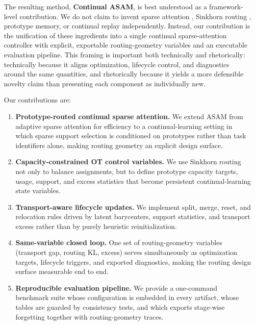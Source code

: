 \documentclass[11pt,a4paper]{article}
\theoremstyle{definition}
\begin{document}
The resulting method, \textbf{Continual ASAM}, is best understood as a framework-level contribution. We do not claim to invent sparse attention \citep{beltagy2020longformer,child2019generating,zaheer2020big}, Sinkhorn routing \citep{cuturi2013sinkhorn}, prototype memory, or continual replay independently. Instead, our contribution is the unification of these ingredients into a single continual sparse-attention controller with explicit, exportable routing-geometry variables and an executable evaluation pipeline. This framing is important both technically and rhetorically: technically because it aligns optimization, lifecycle control, and diagnostics around the same quantities, and rhetorically because it yields a more defensible novelty claim than presenting each component as individually new.

Our contributions are:
\begin{enumerate}
    \item \textbf{Prototype-routed continual sparse attention.} We extend ASAM from adaptive sparse attention for efficiency to a continual-learning setting in which sparse support selection is conditioned on prototypes rather than task identifiers alone, making routing geometry an explicit design surface.
    \item \textbf{Capacity-constrained OT control variables.} We use Sinkhorn routing not only to balance assignments, but to define prototype capacity targets, usage, support, and excess statistics that become persistent continual-learning state variables.
    \item \textbf{Transport-aware lifecycle updates.} We implement split, merge, reset, and relocation rules driven by latent barycenters, support statistics, and transport excess rather than by purely heuristic reinitialization.
    \item \textbf{Same-variable closed loop.} One set of routing-geometry variables (transport gap, routing KL, excess) serves simultaneously as optimization targets, lifecycle triggers, and exported diagnostics, making the routing design surface measurable end to end.
    \item \textbf{Reproducible evaluation pipeline.} We provide a one-command benchmark suite whose configuration is embedded in every artifact, whose tables are guarded by consistency tests, and which exports stage-wise forgetting together with routing-geometry traces.
\end{enumerate}

\end{document}
